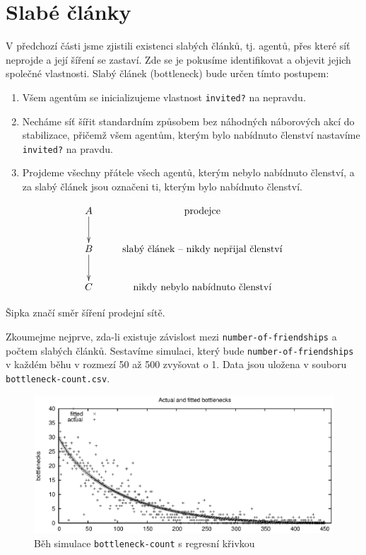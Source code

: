 \documentclass[a4wide,12pt]{report}
\begin{document}
\section{Slabé články}
V předchozí části jsme zjistili existenci slabých článků, tj. agentů, přes které síť neprojde a její šíření se zastaví. Zde se je pokusíme identifikovat a objevit jejich společné vlastnosti. Slabý článek (bottleneck) bude určen tímto postupem:
\begin{enumerate}
\item Všem agentům se inicializujeme vlastnost \texttt{invited?} na nepravdu.
\item Necháme síť šířit standardním způsobem bez náhodných náborových akcí do stabilizace, přičemž všem agentům, kterým bylo nabídnuto členství nastavíme \texttt{invited?} na pravdu.
\item Projdeme všechny přátele všech agentů, kterým nebylo nabídnuto členství, a za slabý článek jsou označeni ti, kterým bylo nabídnuto členství.
\end{enumerate}
\begin{displaymath}
    \xymatrix{ A \ar[d] & \text{prodejce}  \\
               B \ar[d] & \text{slabý článek -- nikdy nepřijal členství} \\
               C & \text{nikdy nebylo nabídnuto členství} }
\end{displaymath}
\begin{center}
Šipka značí směr šíření prodejní sítě.
\end{center}
Zkoumejme nejprve, zda-li existuje závislost mezi \texttt{number-of-friendships} a počtem slabých článků. Sestavíme simulaci, který bude \texttt{number-of-friendships} v každém běhu v rozmezí 50 až 500 zvyšovat o 1. Data jsou uložena v souboru \texttt{bottleneck-count.csv}.
\begin{figure}[h]
  \centering
  \includegraphics{bottleneck-count.eps}
  \caption{Běh simulace \texttt{bottleneck-count} s regresní křivkou}
  \label{fig:bottleneck-count}
\end{figure}
\end{document}
